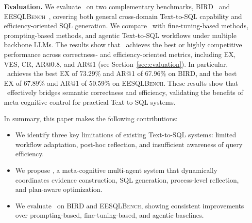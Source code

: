 \textbf{Evaluation.}
We evaluate \toolname\ on two complementary benchmarks, \textsc{BIRD}~\cite{li2023can} and \textsc{EESQLBench}~\cite{lin2026cracking}, covering both general cross-domain Text-to-SQL capability and efficiency-oriented SQL generation.
We compare \toolname\ with fine-tuning-based methods, prompting-based methods, and agentic Text-to-SQL workflows under multiple backbone LLMs.
The results show that \toolname\ achieves the best or highly competitive performance across correctness- and efficiency-oriented metrics, including EX, VES, CR, AR@0.8, and AR@1 (see Section~\ref{sec:evaluation}).
In particular, \toolname\ achieves the best EX of 73.29\% and AR@1 of 67.96\% on \textsc{BIRD}, and the best EX of 67.89\% and AR@1 of 50.59\% on \textsc{EESQLBench}.
These results show that \toolname\ effectively bridges semantic correctness and efficiency, validating the benefits of meta-cognitive control for practical Text-to-SQL systems.

In summary, this paper makes the following contributions:
\begin{itemize}[leftmargin=10pt]	
	
	\item We identify three key limitations of existing Text-to-SQL systems: limited workflow adaptation, post-hoc reflection, and insufficient awareness of query efficiency.
	
	\item We propose \toolname, a meta-cognitive multi-agent system that dynamically coordinates evidence construction, SQL generation, process-level reflection, and plan-aware optimization.
	
	\item We evaluate \toolname\ on \textsc{BIRD} and \textsc{EESQLBench}, showing consistent improvements over prompting-based, fine-tuning-based, and agentic baselines.
\end{itemize}
